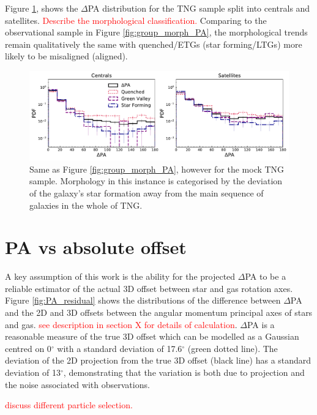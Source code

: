 \documentclass[fleqn,usenatbib]{mnras}
\newcommand{\red}[1]{{\textcolor{red}{#1}}}
\begin{document}
Figure \ref{fig:group_morph_TNG}, shows the $\Delta$PA distribution for the TNG sample split into centrals and satellites. \red{Describe the morphological classification.} Comparing to the observational sample in Figure \ref{fig:group_morph_PA}, the morphological trends remain qualitatively the same with quenched/ETGs (star forming/LTGs) more likely to be misaligned (aligned). 

\begin{figure}
	\includegraphics[width=\linewidth]{tng_appendix/TNG_delPA_sfms_group.pdf}
    \caption{Same as Figure \ref{fig:group_morph_PA}, however for the mock TNG sample. Morphology in this instance is categorised by the deviation of the galaxy's star formation away from the main sequence of galaxies in the whole of TNG.}
    \label{fig:group_morph_TNG}
\end{figure}

\section{PA vs absolute offset}
A key assumption of this work is the ability for the projected $\Delta$PA to be a reliable estimator of the actual 3D offset between star and gas rotation axes. Figure \ref{fig:PA_residual} shows the distributions of the difference between $\Delta$PA and the 2D and 3D offsets between the angular momentum principal axes of stars and gas. \red{see description in section X for details of calculation}. $\Delta$PA is a reasonable measure of the true 3D offset which can be modelled as a Gaussian centred on 0$^{\circ}$ with a standard deviation of 17.6$^{\circ}$ (green dotted line). The deviation of the 2D projection from the true 3D offset (black line) has a standard deviation of 13$^{\circ}$, demonstrating that the variation is both due to projection and the noise associated with observations.

\red{discuss different particle selection.}
\end{document}
